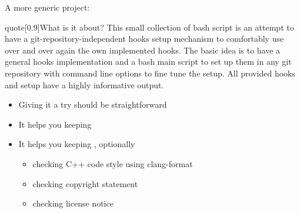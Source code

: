\begin{frame}{A more generic project: }
    \begin{varblock}{quote}[0.9\textwidth]{What is it about?}
        This small collection of bash script is an attempt to have a git-repository-independent hooks setup mechanism to comfortably use over and over again the own implemented hooks.
        The basic idea is to have a general hooks implementation and a bash main script to set up them in any git repository with command line options to fine tune the setup.
        All provided hooks and setup have a highly informative output.
    \end{varblock}
    \vspace{2mm}
    \begin{itemize}
        \item Giving it a try should be straightforward
        \item It helps you keeping  
        \item It helps you keeping , optionally 
              \begin{itemize}
                  \item checking C++ code style using clang-format
                  \item checking copyright statement
                  \item checking license notice
              \end{itemize}
    \end{itemize}
\end{frame}
